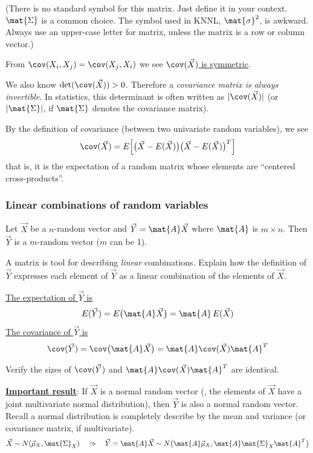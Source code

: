 \documentclass[12pt]{article}
\begin{document}
(There is no standard symbol for this matrix.
Just define it in your context.
$\mat{\Sigma}$ is a common choice.
The symbol used in KNNL, $\mat{\sigma}^2$, is awkward.
Always use an upper-case letter for matrix, unless the matrix is a row
or column vector.)

From $\cov(X_i, X_j) = \cov(X_j, X_i)$
we see \underline{$\cov(\vec{X})$ is symmetric}.

We also know
$\det(\cov(\vec{X})) > 0$.
Therefore a \emph{covariance matrix is always invertible}.
In statistics, this determinant is often written as $|\cov(\vec{X})|$
(or $|\mat{\Sigma}|$, if $\mat{\Sigma}$ denotes the covariance matrix).

By the definition of covariance
(between two univariate random variables), we see
\[
\cov(\vec{X})
= E\Bigl[
    \big(\vec{X} - E(\vec{X})\bigr)
    \bigl(\vec{X} - E(\vec{X})\bigr)^T
    \Bigr]
\]
that is,
it is the expectation of a random matrix whose elements are
``centered cross-products''.

\subsubsection{Linear combinations of random variables}

Let $\vec{X}$ be a $n$-random vector and
$\vec{Y} = \mat{A}\vec{X}$ where $\mat{A}$ is $m \times n$.
Then $\vec{Y}$ is a $m$-random vector ($m$ can be 1).

\exercise
A matrix is tool for describing \emph{linear} combinations.
Explain how the definition of $\vec{Y}$
expresses each element of $\vec{Y}$ as a linear combination of the
elements of $\vec{X}$.

\underline{The expectation of $\vec{Y}$ is}
\[
E(\vec{Y})
= E\bigl(\mat{A}\vec{X}\bigr)
= \mat{A}\, E(\vec{X})
\]
\underline{The covariance of $\vec{Y}$ is}
\[
\cov(\vec{Y})
= \cov\bigl(\mat{A}\vec{X}\bigr)
= \mat{A}\cov(\vec{X})\mat{A}^T
\]

\exercise
Verify the sizes of $\cov(\vec{Y})$
and $\mat{A}\cov(\vec{X})\mat{A}^T$ are identical.

\underline{\textbf{Important result}}:
If $\vec{X}$ is a normal random vector
(\ie, the elements of $\vec{X}$ have a joint multivariate normal
distribution),
then $\vec{Y}$ is also a normal random vector.
Recall a normal distribution is completely describe by the mean and
variance (or covariance matrix, if multivariate).
\[
\vec{X} \sim N(\vec{\mu}_X, \mat{\Sigma}_X)
\quad
\Rightarrow
\quad
\vec{Y} = \mat{A}\vec{X} \sim
    N\bigl(\mat{A}\vec{\mu}_X, \mat{A}\mat{\Sigma}_X\mat{A}^T\bigr)
\]
\end{document}

